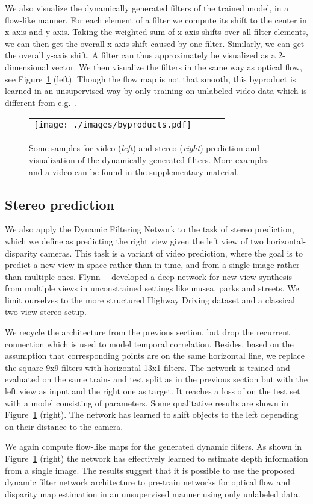 We also visualize the dynamically generated filters of the trained model,
 in a flow-like manner.
For each element of a filter we compute its shift to the center in x-axis and y-axis.
Taking the weighted sum of x-axis shifts over all filter elements, we can then get the overall x-axis shift caused by one filter. Similarly, we can get the overall y-axis shift.
A filter can thus approximately be visualized as a 2-dimensional vector.
We then visualize the filters in the same way as optical flow, see Figure~\ref{fig:byproducts} (left).
Though the flow map is not that smooth, this byproduct is learned in an unsupervised way by only training on unlabeled video data which is different from e.g.~\cite{Dosovitskiy-ICCV15}. 

\begin{figure}[t]
	\centering
    \begin{tabular}{cccc}
		\texttt{[image: ./images/byproducts.pdf]}
	\end{tabular}
	\caption{\small Some samples for video (\emph{left}) and stereo (\emph{right}) prediction and visualization of the dynamically generated filters. More examples and a video can be found in the supplementary material.}
	\label{fig:byproducts}
\end{figure}

\subsection{Stereo prediction}
We also apply the Dynamic Filtering Network to the task of stereo prediction, which we define as predicting the right view given the left view of two horizontal-disparity cameras.
This task is a variant of video prediction, where the goal is to predict a new view in space rather than in time, and from a single image rather than multiple ones. 
Flynn~\etal~\cite{Flynn-CVPR15} developed a deep network for new view synthesis from multiple views in unconstrained settings like musea, parks and streets. 
We limit ourselves to the more structured Highway Driving dataset and a classical two-view stereo setup. 

We recycle the architecture from the previous section, but drop the recurrent connection which is used to model temporal correlation. 
Besides, based on the assumption that corresponding points are on the same horizontal line, we replace the square 9x9 filters with horizontal 13x1 filters. The network is trained and evaluated on the same train- and test split as in the previous section but with the left view as input and the right one as target. It reaches a loss of  on the test set with a model consisting of  parameters. Some qualitative results are shown in Figure~\ref{fig:byproducts} (right). The network has learned to shift objects to the left depending on their distance to the camera.

We again compute flow-like maps for the generated dynamic filters.
As shown in Figure~\ref{fig:byproducts} (right) the network has effectively learned to estimate depth information from a single image.
The results suggest that it is possible to use the proposed dynamic filter network architecture to pre-train networks for optical flow and disparity map estimation in an unsupervised manner using only unlabeled data. 